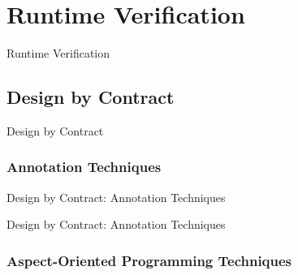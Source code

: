 \documentclass[12pt]{beamer}
\begin{document}

\section{Runtime Verification}
\label{sec:runver}

\begin{frame}{Runtime Verification}


\end{frame}


\subsection{Design by Contract}
\label{sec:runver-dbc}

\begin{frame}{Design by Contract}

\end{frame}

\subsubsection{Annotation Techniques}
\label{sec:runver-dbc-ann}

\begin{frame}{Design by Contract: Annotation Techniques}

\end{frame}

\begin{frame}{Design by Contract: Annotation Techniques}
\end{frame}

\subsubsection{Aspect-Oriented Programming Techniques}
\label{sec:runver-sbc-aop}
\end{document}
